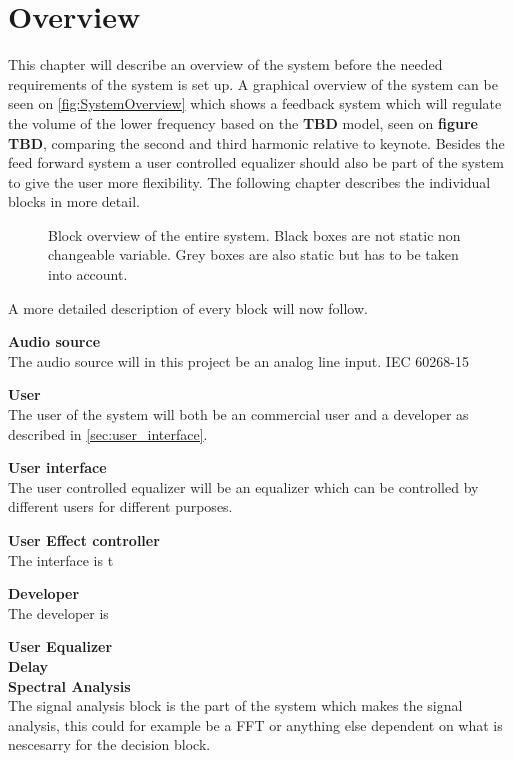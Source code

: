 \chapter{Overview} \label{ch:overview}
This chapter will describe an overview of the system before the needed requirements of the system is set up. A graphical overview of the system can be seen on \autoref{fig:SystemOverview} which shows a feedback system which will regulate the volume of the lower frequency based on the \textbf{TBD} model, seen on \textbf{figure TBD}, comparing the second and third harmonic relative to keynote. Besides the feed forward system a user controlled equalizer should also be part of the system to give the user more flexibility. The following chapter describes the individual blocks in more detail.          

\begin{figure}[H]
\centering
{}
\scalebox{0.8}{
}
\caption{Block overview of the entire system. Black boxes are not static non changeable variable. Grey boxes are also static but has to be taken into account.}
\label{fig:SystemOverview}
\end{figure}
A more detailed description of every block will now follow.

\textbf{Audio source} \\
The audio source will in this project be an analog line input. IEC 60268-15

\textbf{User} \\
The user of the system will both be an commercial user and a developer as described in \autoref{sec:user_interface}. 

\textbf{User interface}\\
The user controlled equalizer will be an equalizer which can be controlled by different users for different purposes.

\textbf{User Effect controller} \\
The interface is t 

\textbf{Developer} \\
The developer is

\textbf{User Equalizer} \\

\textbf{Delay} \\

\textbf{Spectral Analysis} \\
The signal analysis block is the part of the system which makes the signal analysis, this could for example be a FFT or anything else dependent on what is nescesarry for the decision block.

